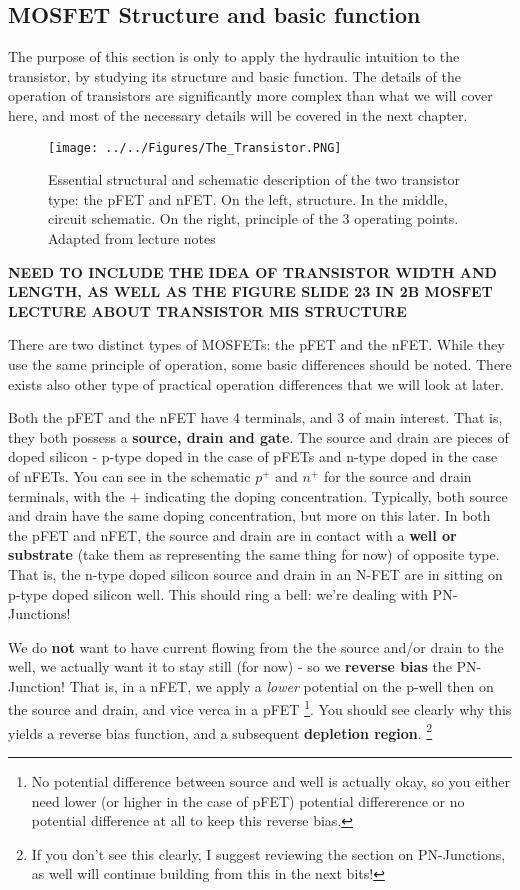 \subsection{MOSFET Structure and basic function}

The purpose of this section is only to apply the hydraulic intuition to the transistor, by studying its structure and basic function. The details of the operation of transistors are significantly more complex than what we will cover here, and most of the necessary details will be covered in the next chapter.  

\begin{figure}[H]
    \centering
    \texttt{[image: ../../Figures/The\_Transistor.PNG]}
    \caption{Essential structural and schematic description of the two transistor type: the pFET and nFET. On the left, structure. In the middle, circuit schematic. On the right, principle of the 3 operating points. Adapted from lecture notes}
    \label{fig:The Transistor}
\end{figure}


\textbf{NEED TO INCLUDE THE IDEA OF TRANSISTOR WIDTH AND LENGTH, AS WELL AS THE FIGURE SLIDE 23 IN 2B MOSFET LECTURE ABOUT TRANSISTOR MIS STRUCTURE}


There are two distinct types of MOSFETs: the pFET and the nFET. While they use the same principle of operation, some basic differences should be noted. There exists also other type of practical operation differences that we will look at later.

Both the pFET and the nFET have 4 terminals, and 3 of main interest. That is, they both possess a \textbf{source, drain and gate}. The source and drain are pieces of doped silicon - p-type doped in the case of pFETs and n-type doped in the case of nFETs. You can see in the schematic $p^+$ and $n^+$ for the source and drain terminals, with the $+$ indicating the doping concentration. Typically, both source and drain have the same doping concentration, but more on this later. In both the pFET and nFET, the source and drain are in contact with a \textbf{well or substrate} (take them as representing the same thing for now) of opposite type. That is, the n-type doped silicon source and drain in an N-FET are in sitting on p-type doped silicon well. This should ring a bell: we're dealing with PN-Junctions!  

We do \textbf{not} want to have current flowing from the the source and/or drain to the well, we actually want it to stay still (for now) - so we \textbf{reverse bias} the PN-Junction! That is, in a nFET, we apply a \textit{lower} potential on the p-well then on the source and drain, and vice verca in a pFET \footnote{No potential difference between source and well is actually okay, so you either need lower (or higher in the case of pFET) potential differerence or no potential difference at all to keep this reverse bias.}. You should see clearly why this yields a reverse bias function, and a subsequent \textbf{depletion region}. \footnote{If you don't see this clearly, I suggest reviewing the section on PN-Junctions, as well will continue building from this in the next bits!}


